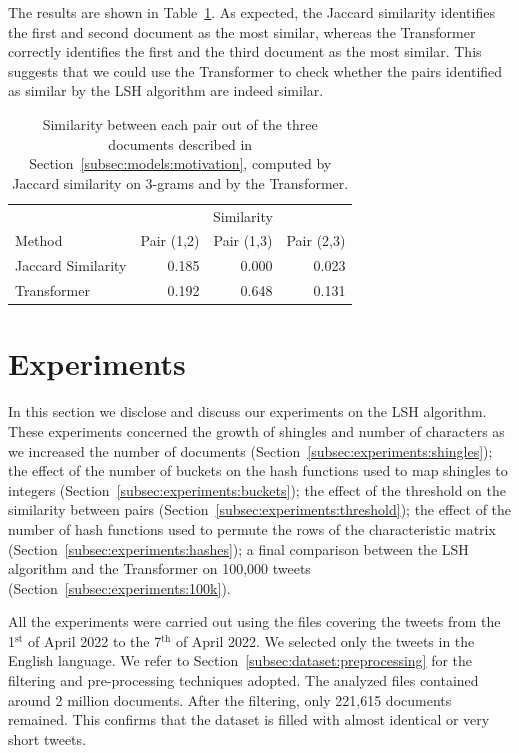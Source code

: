 \documentclass[runningheads]{llncs}
\begin{document}
The results are shown in Table~\ref{tab:models:comparison}. As expected, the Jaccard similarity identifies the first and second document as the most similar, whereas the Transformer correctly identifies the first and the third document as the most similar. This suggests that we could use the Transformer to check whether the pairs identified as similar by the LSH algorithm are indeed similar.

\begin{table}
  \caption{Similarity between each pair out of the three documents described in Section~\ref{subsec:models:motivation}, computed by Jaccard similarity on 3-grams and by the Transformer.}
  \label{tab:models:comparison}
  \centering
  \begin{tabular}{lrrr}
      \toprule
      & \multicolumn{3}{c}{Similarity} \\
      Method & Pair (1,2) & Pair (1,3) & Pair (2,3) \\
      \midrule
      Jaccard Similarity & 0.185 & 0.000 & 0.023\\
      Transformer & 0.192 & 0.648 & 0.131 \\
      \bottomrule
  \end{tabular}
\end{table}

\section{Experiments}
\label{sec:experiments}

In this section we disclose and discuss our experiments on the LSH algorithm. These experiments concerned the growth of shingles and number of characters as we increased the number of documents (Section~\ref{subsec:experiments:shingles}); the effect of the number of buckets on the hash functions used to map shingles to integers (Section~\ref{subsec:experiments:buckets}); the effect of the threshold on the similarity between pairs (Section~\ref{subsec:experiments:threshold}); the effect of the number of hash functions used to permute the rows of the characteristic matrix (Section~\ref{subsec:experiments:hashes}); a final comparison between the LSH algorithm and the Transformer on 100,000 tweets (Section~\ref{subsec:experiments:100k}).

All the experiments were carried out using the files covering the tweets from the 1$^{\text{st}}$ of April 2022 to the 7$^{\text{th}}$ of April 2022. We selected only the tweets in the English language. We refer to Section~\ref{subsec:dataset:preprocessing} for the filtering and pre-processing techniques adopted. The analyzed files contained around 2 million documents. After the filtering, only 221,615 documents remained. This confirms that the dataset is filled with almost identical or very short tweets. 
\end{document}
